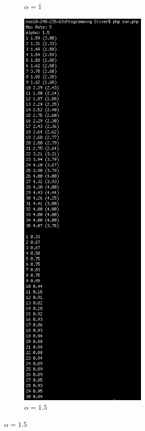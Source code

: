 \documentclass{article}
\begin{document}
\begin{figure}[ht]
\begin{subfigure}{0.5\textwidth}
\caption{$\alpha = 1$}
\label{fig:screen_alpha1}
\end{subfigure}%
\begin{subfigure}{0.5\textwidth}
\centering
\includegraphics[width=0.675\textwidth]{Screenshots/Alpha1_5}
\caption{$\alpha = 1.5$}
\label{fig:screen_alpha1.5}
\end{subfigure}
\end{figure}
\end{document}

